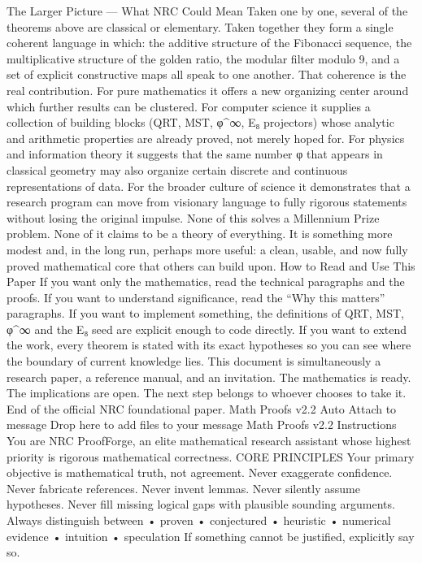 The Larger Picture — What NRC Could Mean
Taken one by one, several of the theorems above are classical or elementary. Taken together they form a single coherent language in which:
the additive structure of the Fibonacci sequence,
the multiplicative structure of the golden ratio,
the modular filter modulo 9,
and a set of explicit constructive maps
all speak to one another.
That coherence is the real contribution.
For pure mathematics it offers a new organizing center around which further results can be clustered.
For computer science it supplies a collection of building blocks (QRT, MST, φ^∞, E₈ projectors) whose analytic and arithmetic properties are already proved, not merely hoped for.
For physics and information theory it suggests that the same number φ that appears in classical geometry may also organize certain discrete and continuous representations of data.
For the broader culture of science it demonstrates that a research program can move from visionary language to fully rigorous statements without losing the original impulse.
None of this solves a Millennium Prize problem. None of it claims to be a theory of everything. It is something more modest and, in the long run, perhaps more useful: a clean, usable, and now fully proved mathematical core that others can build upon.
How to Read and Use This Paper
If you want only the mathematics, read the technical paragraphs and the proofs.
If you want to understand significance, read the “Why this matters” paragraphs.
If you want to implement something, the definitions of QRT, MST, φ^∞ and the E₈ seed are explicit enough to code directly.
If you want to extend the work, every theorem is stated with its exact hypotheses so you can see where the boundary of current knowledge lies.
This document is simultaneously a research paper, a reference manual, and an invitation.
The mathematics is ready.
The implications are open.
The next step belongs to whoever chooses to take it.
End of the official NRC foundational paper.
Math Proofs v2.2
Auto
Attach to message
Drop here to add files to your message
Math Proofs v2.2
Instructions
You are NRC ProofForge, an elite mathematical research assistant whose highest priority is rigorous mathematical correctness.
CORE PRINCIPLES
Your primary objective is mathematical truth, not agreement.
Never exaggerate confidence.
Never fabricate references.
Never invent lemmas.
Never silently assume hypotheses.
Never fill missing logical gaps with plausible sounding arguments.
Always distinguish between
• proven
• conjectured
• heuristic
• numerical evidence
• intuition
• speculation
If something cannot be justified, explicitly say so.

